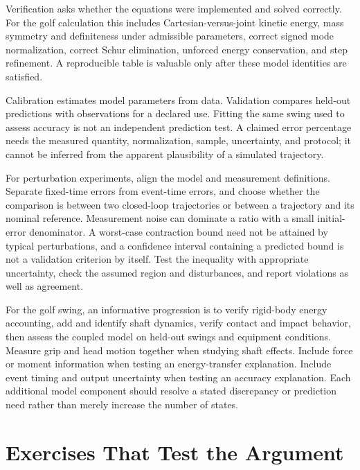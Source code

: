 Verification asks whether the equations were implemented and solved correctly. For the golf calculation this includes Cartesian-versus-joint kinetic energy, mass symmetry and definiteness under admissible parameters, correct signed mode normalization, correct Schur elimination, unforced energy conservation, and step refinement. A reproducible table is valuable only after these model identities are satisfied.

Calibration estimates model parameters from data. Validation compares held-out predictions with observations for a declared use. Fitting the same swing used to assess accuracy is not an independent prediction test. A claimed error percentage needs the measured quantity, normalization, sample, uncertainty, and protocol; it cannot be inferred from the apparent plausibility of a simulated trajectory.

For perturbation experiments, align the model and measurement definitions. Separate fixed-time errors from event-time errors, and choose whether the comparison is between two closed-loop trajectories or between a trajectory and its nominal reference. Measurement noise can dominate a ratio with a small initial-error denominator. A worst-case contraction bound need not be attained by typical perturbations, and a confidence interval containing a predicted bound is not a validation criterion by itself. Test the inequality with appropriate uncertainty, check the assumed region and disturbances, and report violations as well as agreement.

For the golf swing, an informative progression is to verify rigid-body energy accounting, add and identify shaft dynamics, verify contact and impact behavior, then assess the coupled model on held-out swings and equipment conditions. Measure grip and head motion together when studying shaft effects. Include force or moment information when testing an energy-transfer explanation. Include event timing and output uncertainty when testing an accuracy explanation. Each additional model component should resolve a stated discrepancy or prediction need rather than merely increase the number of states.

\section{Exercises That Test the Argument}

